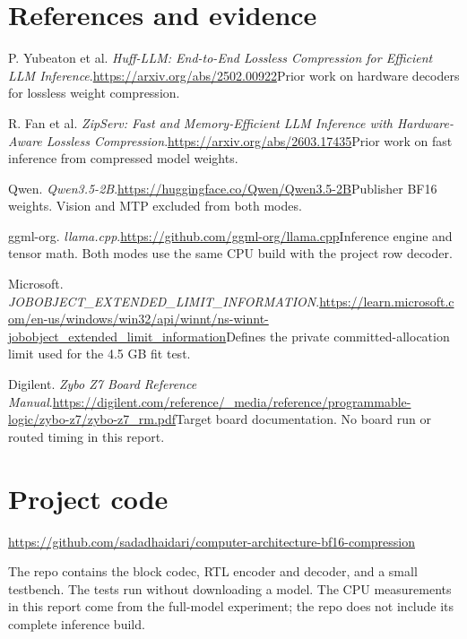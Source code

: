 \documentclass[10pt,letterpaper]{article}
\begin{document}
\section*{References and evidence}
{\small\noindent [1] P. Yubeaton et al. \textit{Huff-LLM: End-to-End Lossless Compression for Efficient LLM Inference}.\newline \url{https://arxiv.org/abs/2502.00922}\newline Prior work on hardware decoders for lossless weight compression.\par}
\vspace{4pt}
{\small\noindent [2] R. Fan et al. \textit{ZipServ: Fast and Memory-Efficient LLM Inference with Hardware-Aware Lossless Compression}.\newline \url{https://arxiv.org/abs/2603.17435}\newline Prior work on fast inference from compressed model weights.\par}
\vspace{4pt}
{\small\noindent [3] Qwen. \textit{Qwen3.5-2B}.\newline \url{https://huggingface.co/Qwen/Qwen3.5-2B}\newline Publisher BF16 weights. Vision and MTP excluded from both modes.\par}
\vspace{4pt}
{\small\noindent [4] ggml-org. \textit{llama.cpp}.\newline \url{https://github.com/ggml-org/llama.cpp}\newline Inference engine and tensor math. Both modes use the same CPU build with the project row decoder.\par}
\vspace{4pt}
{\small\noindent [5] Microsoft. \textit{JOBOBJECT\_EXTENDED\_LIMIT\_INFORMATION}.\newline \url{https://learn.microsoft.com/en-us/windows/win32/api/winnt/ns-winnt-jobobject_extended_limit_information}\newline Defines the private committed-allocation limit used for the 4.5 GB fit test.\par}
\vspace{4pt}
{\small\noindent [6] Digilent. \textit{Zybo Z7 Board Reference Manual}.\newline \url{https://digilent.com/reference/_media/reference/programmable-logic/zybo-z7/zybo-z7_rm.pdf}\newline Target board documentation. No board run or routed timing in this report.\par}
\vspace{4pt}
\section*{Project code}
\noindent\url{https://github.com/sadadhaidari/computer-architecture-bf16-compression}\par
The repo contains the block codec, RTL encoder and decoder, and a small testbench. The tests run without downloading a model. The CPU measurements in this report come from the full-model experiment; the repo does not include its complete inference build.
\end{document}
